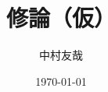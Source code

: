 \documentclass{ltjsarticle}
\begin{document}
\title{修論（仮）}
\author{中村友哉}
\date{\today}
\maketitle
\clearpage
\tableofcontents
\clearpage











\end{document}
